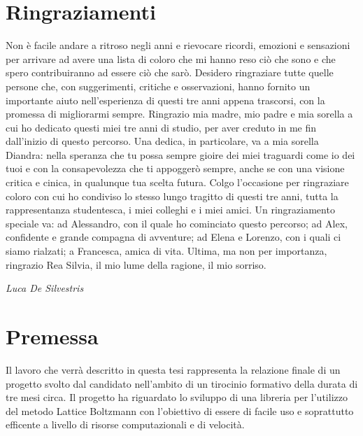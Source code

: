 \section{Ringraziamenti}
\label{sec:ringraziamenti}

Non \`e facile andare a ritroso negli anni e rievocare ricordi, emozioni e sensazioni per arrivare ad avere una lista di coloro che mi hanno reso ci\`o che sono e che spero contribuiranno ad essere ci\`o che sar\`o. Desidero ringraziare tutte quelle persone che, con suggerimenti, critiche e osservazioni, hanno fornito un importante aiuto nell'esperienza di questi tre anni appena trascorsi, con la promessa di migliorarmi sempre.	
Ringrazio mia madre, mio padre e mia sorella a cui ho dedicato questi miei tre anni di studio, per aver creduto in me fin dall'inizio di questo percorso. Una dedica, in particolare, va a mia sorella Diandra: nella speranza che tu possa sempre gioire dei miei traguardi come io dei tuoi e con la consapevolezza che ti appogger\`o sempre, anche se con una visione critica e cinica, in qualunque tua scelta futura. Colgo l'occasione per ringraziare coloro con cui ho condiviso lo stesso lungo tragitto di questi tre anni, tutta la rappresentanza studentesca, i miei colleghi e i miei amici. Un ringraziamento speciale va: ad Alessandro, con il quale ho cominciato questo percorso; ad Alex, confidente e grande compagna di avventure; ad Elena e Lorenzo, con i quali ci siamo rialzati; a Francesca, amica di vita. Ultima, ma non per importanza, ringrazio Rea Silvia, il mio lume della ragione, il mio sorriso.
   \begin{flushright}
   	\textit{Luca De Silvestris}
   \end{flushright} 
\newpage
\section{Premessa}
Il lavoro che verr\`a descritto in questa tesi rappresenta la relazione finale di un progetto svolto dal candidato nell'ambito di un tirocinio formativo della durata di tre mesi circa. Il progetto ha riguardato lo sviluppo di una libreria per l'utilizzo del metodo Lattice Boltzmann con l'obiettivo di essere di facile uso e soprattutto efficente a livello di risorse computazionali e di velocit\`a.

